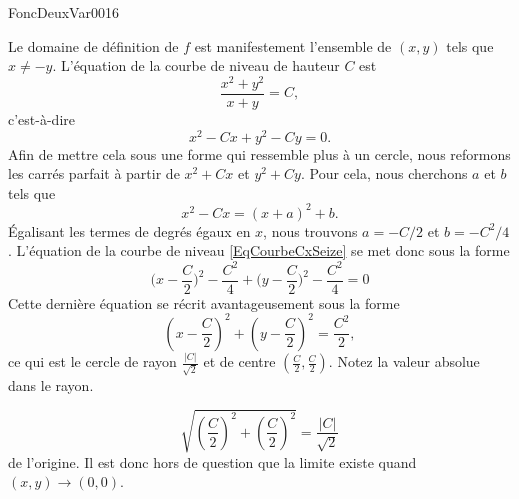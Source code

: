 

\begin{corrige}{FoncDeuxVar0016}

	Le domaine de définition de $f$ est manifestement l'ensemble de $(x,y)$ tels que $x\neq -y$. L'équation de la courbe de niveau de hauteur $C$ est
	\begin{equation}
		\frac{ x^2+y^2 }{ x+y }=C,
	\end{equation}
	c'est-à-dire
	\begin{equation}
		x^2-Cx+y^2-Cy=0.
	\end{equation}
	Afin de mettre cela sous une forme qui ressemble plus à un cercle, nous reformons les carrés parfait à partir de $x^2+Cx$ et $y^2+Cy$. Pour cela, nous cherchons $a$ et $b$ tels que
	\begin{equation}	\label{EqCourbeCxSeize}
		x^2-Cx=(x+a)^2+b.
	\end{equation}
	Égalisant les termes de degrés égaux en $x$, nous trouvons $a=-C/2$ et $b=-C^2/4$. L'équation de la courbe de niveau \eqref{EqCourbeCxSeize} se met donc sous la forme
	\begin{equation}
		\big( x-\frac{ C }{ 2 } \big)^2-\frac{ C^2 }{ 4 }+\big( y-\frac{ C }{ 2 } \big)^2-\frac{ C^2 }{ 4 }=0
	\end{equation}
	Cette dernière équation se récrit avantageusement sous la forme
	\begin{equation}
		\left( x-\frac{ C }{2} \right)^2+\left( y-\frac{ C }{2} \right)^2=\frac{ C^2 }{2},
	\end{equation}
	ce qui est le cercle de rayon $\frac{ | C | }{  \sqrt{2} }$ et de centre $(\frac{ C }{2},\frac{ C }{2})$. Notez la valeur absolue dans le rayon.

	\begin{equation}
		\sqrt{ \left( \frac{ C }{ 2 } \right)^2+\left( \frac{ C }{ 2 } \right)^2 }=\frac{ | C | }{ \sqrt{2} }
	\end{equation}
	de l'origine. Il est donc hors de question que la limite existe quand $(x,y)\to(0,0)$.

\end{corrige}
